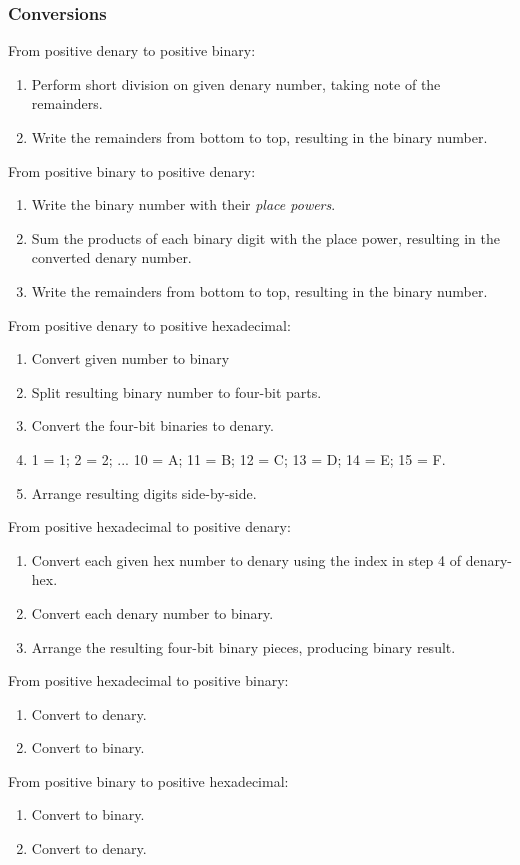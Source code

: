\documentclass{article}
\begin{document}
\subsubsection*{Conversions}
From positive denary to positive binary:
\begin{enumerate}
	\item Perform short division on given denary number, taking note of the remainders.
	\item Write the remainders from bottom to top, resulting in the binary number.
\end{enumerate}
From positive binary to positive denary:
\begin{enumerate}
	\item Write the binary number with their \textit{place powers}.
	\item Sum the products of each binary digit with the place power, resulting in the
		converted denary number.
	\item Write the remainders from bottom to top, resulting in the binary number.
\end{enumerate}
From positive denary to positive hexadecimal:
\begin{enumerate}
	\item Convert given number to binary
	\item Split resulting binary number to four-bit parts.
	\item Convert the four-bit binaries to denary.
	\item 1 = 1; 2 = 2; ... 10 = A; 11 = B; 12 = C; 13 = D; 14 = E; 15 = F.
	\item Arrange resulting digits side-by-side.
\end{enumerate}
From positive hexadecimal to positive denary:
\begin{enumerate}
	\item Convert each given hex number to denary using the index in step 4 of 
		denary-hex.
	\item Convert each denary number to binary.
	\item Arrange the resulting four-bit binary pieces, producing binary result.
\end{enumerate}
From positive hexadecimal to positive binary:
\begin{enumerate}
	\item Convert to denary.
	\item Convert to binary.
\end{enumerate}
From positive binary to positive hexadecimal:
\begin{enumerate}
	\item Convert to binary.
	\item Convert to denary.
\end{enumerate}
\end{document}
